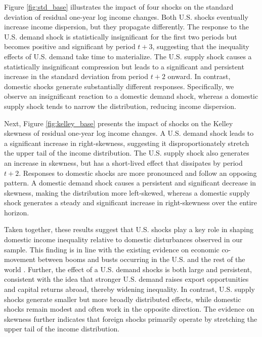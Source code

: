\documentclass[12pt, a4paper]{article}
\begin{document}
Figure \ref{fig:std_base} illustrates the impact of four shocks on the standard deviation of residual one-year log income changes. Both U.S. shocks eventually increase income dispersion, but they propagate differently. The response to the U.S. demand shock is statistically insignificant for the first two periods but becomes positive and significant by period $t+3$, suggesting that the inequality effects of U.S. demand take time to materialize. The U.S. supply shock causes a statistically insignificant compression but leads to a significant and persistent increase in the standard deviation from period $t+2$ onward. In contrast, domestic shocks generate substantially different responses. Specifically, we observe an insignificant reaction to a domestic demand shock, whereas a domestic supply shock tends to narrow the distribution, reducing income dispersion.

Next, Figure \ref{fig:kelley_base} presents the impact of shocks on the Kelley skewness of residual one-year log income changes. A U.S. demand shock leads to a significant increase in right-skewness, suggesting it disproportionately stretch the upper tail of the income distribution. The U.S. supply shock also generates an increase in skewness, but has a short-lived effect that dissipates by period $t+2$. Responses to domestic shocks are more pronounced and follow an opposing pattern. A domestic demand shock causes a persistent and significant decrease in skewness, making the distribution more left-skewed, whereas a domestic supply shock generates a steady and significant increase in right-skewness over the entire horizon.

Taken together, these results suggest that U.S. shocks play a key role in shaping domestic income inequality relative to domestic disturbances observed in our sample. This finding is in line with the existing evidence on economic co-movement between booms and busts occurring in the U.S. and the rest of the world \parencite{Kose2003, Kose2012, Fink2015}. Further, the effect of a U.S. demand shocks is both large and persistent, consistent with the idea that stronger U.S. demand raises export opportunities and capital returns abroad, thereby widening inequality. In contrast, U.S. supply shocks generate smaller but more broadly distributed effects, while domestic shocks remain modest and often work in the opposite direction. The evidence on skewness further indicates that foreign shocks primarily operate by stretching the upper tail of the income distribution.
\end{document}
